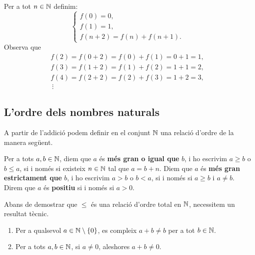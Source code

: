 \begin{solucio}
Per a tot $n\in \mathbb{N}$ definim:
\[
\left\{
\begin{array}{l}
f(0)=0, \\
f(1)=1, \\
f(n+2)=f(n)+f(n+1).
\end{array}
\right.
\]
Observa que
\[
\begin{array}{l}
f(2)=f(0+2)=f(0)+f(1)=0+1=1,\\
f(3)=f(1+2)=f(1)+f(2)=1+1=2,\\
f(4)=f(2+2)=f(2)+f(3)=1+2=3,\\
\ \vdots
\end{array}
\]
\end{solucio}

\subsection{L'ordre dels nombres naturals}

A partir de l'addició podem definir en el conjunt $\mathbb{N}$ una relació d'ordre de la manera següent.

\begin{definicio}
Per a tots $a,b\in \mathbb{N}$, diem que $a$ és \textbf{més gran o igual que} $b$, i ho escrivim $a\geq b$ o $b\leq a$, si i només si existeix $n\in \mathbb{N}$ tal que $a=b+n$. Diem que $a$ és \textbf{més gran estrictament que} $b$, i ho escrivim $a>b$ o $b<a$, si i només si $a\geq b$ i $a\neq b$. Direm que $a$ és \textbf{positiu} si i només si $a>0$.
\end{definicio}

Abans de demostrar que $\leq$ és una relació d'ordre total en $\mathbb{N}$, necessitem un resultat tècnic.

\begin{proposicio}\label{prop:suma-no-fixa}
\begin{enumerate}[label=(\roman*)]
\item Per a qualsevol $a\in \mathbb{N}\setminus \{0\}$, es compleix $a+b\neq b$ per a tot $b\in \mathbb{N}$.
\label{prop:suma-no-fixa:i}

\item Per a tots $a,b\in\mathbb{N}$, si $a\neq 0$, aleshores $a+b\neq 0$.
\label{prop:suma-no-fixa:ii}
\end{enumerate}
\end{proposicio}

